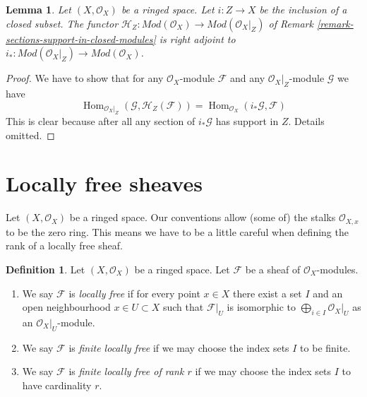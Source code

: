 \documentclass{stacks-project}
\theoremstyle{plain}
\newtheorem{lemma}[subsection]{Lemma}
\theoremstyle{definition}
\newtheorem{definition}[subsection]{Definition}
\theoremstyle{remark}
\numberwithin{equation}{subsection}
\def\Hom{\mathop{\mathrm{Hom}}\nolimits}
\begin{document}
\begin{lemma}
\label{lemma-adjoint-section-with-support}
Let $(X, \mathcal{O}_X)$ be a ringed space. Let $i : Z \to X$ be the
inclusion of a closed subset. The functor
$\mathcal{H}_Z : \textit{Mod}(\mathcal{O}_X) \to
\textit{Mod}(\mathcal{O}_X|_Z)$ of
Remark \ref{remark-sections-support-in-closed-modules}
is right adjoint to
$i_* : \textit{Mod}(\mathcal{O}_X|_Z) \to \textit{Mod}(\mathcal{O}_X)$.
\end{lemma}

\begin{proof}
We have to show that for any $\mathcal{O}_X$-module $\mathcal{F}$
and any $\mathcal{O}_X|_Z$-module $\mathcal{G}$ we have
$$
\Hom_{\mathcal{O}_X|_Z}(\mathcal{G}, \mathcal{H}_Z(\mathcal{F})) =
\Hom_{\mathcal{O}_X}(i_*\mathcal{G}, \mathcal{F})
$$
This is clear
because after all any section of $i_*\mathcal{G}$ has support in $Z$.
Details omitted.
\end{proof}










\section{Locally free sheaves}
\label{section-locally-free}

\noindent
Let $(X, \mathcal{O}_X)$ be a ringed space.
Our conventions allow (some of) the stalks $\mathcal{O}_{X, x}$
to be the zero ring. This means we have to be a little careful
when defining the rank of a locally free sheaf.

\begin{definition}
\label{definition-locally-free}
Let $(X, \mathcal{O}_X)$ be a ringed space.
Let $\mathcal{F}$ be a sheaf of $\mathcal{O}_X$-modules.
\begin{enumerate}
\item We say $\mathcal{F}$ is {\it locally free} if for every
point $x \in X$ there exist a set $I$ and an open
neighbourhood $x \in U \subset X$
such that $\mathcal{F}|_U$ is isomorphic to
$\bigoplus_{i \in I} \mathcal{O}_X|_U$ as an $\mathcal{O}_X|_U$-module.
\item We say $\mathcal{F}$ is {\it finite locally free} if we may
choose the index sets $I$ to be finite.
\item We say $\mathcal{F}$ is {\it finite locally free of rank $r$}
if we may choose the index sets $I$ to have cardinality $r$.
\end{enumerate}
\end{definition}
\end{document}

